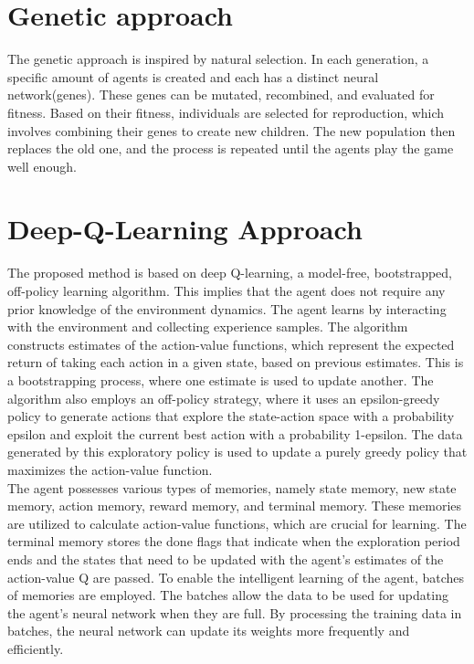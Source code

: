 \documentclass[letterpaper]{article} %
\begin{document}
\section{Genetic approach}
The genetic approach is inspired by natural selection.
In each generation, a specific amount of agents is created and each has a distinct neural network(genes).
These genes can be mutated, recombined, and evaluated for fitness.
Based on their fitness, individuals are selected for reproduction, which involves combining their genes to create new children.
The new population then replaces the old one, and the process is repeated until the agents play the game well enough.\\

\section{Deep-Q-Learning Approach}
The proposed method is based on deep Q-learning, a model-free, bootstrapped, off-policy learning algorithm.
This implies that the agent does not require any prior knowledge of the environment dynamics.
The agent learns by interacting with the environment and collecting experience samples.
The algorithm constructs estimates of the action-value functions, which represent the expected return of taking each action in a given state, based on previous estimates.
This is a bootstrapping process, where one estimate is used to update another.
The algorithm also employs an off-policy strategy, where it uses an epsilon-greedy policy to generate actions that explore the state-action space with a probability epsilon and exploit the current best action with a probability 1-epsilon.
The data generated by this exploratory policy is used to update a purely greedy policy that maximizes the action-value function.\\

The agent possesses various types of memories, namely state memory, new state memory, action memory, reward memory, and terminal memory.
These memories are utilized to calculate action-value functions, which are crucial for learning.
The terminal memory stores the done flags that indicate when the exploration period ends and the states that need to be updated with the agent's estimates of the action-value Q are passed.
To enable the intelligent learning of the agent, batches of memories are employed.
The batches allow the data to be used for updating the agent's neural network when they are full.
By processing the training data in batches, the neural network can update its weights more frequently and efficiently.\\
\end{document}
